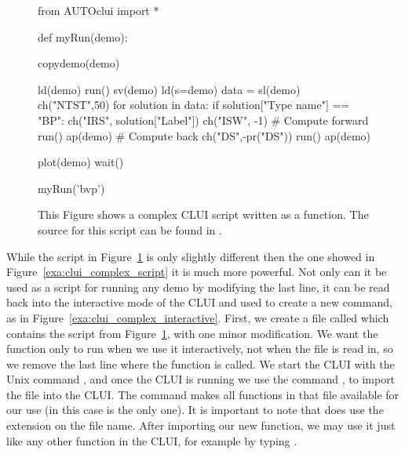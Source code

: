 \begin{figure}[htbp]
{\small \begin{center} \begin{boxedverbatim}
from AUTOclui import *

def myRun(demo):

    copydemo(demo)

    ld(demo)
    run()
    sv(demo)
    ld(s=demo)
    data = sl(demo)
    ch("NTST",50)
    for solution in data:
        if solution["Type name"] == "BP":
            ch("IRS", solution["Label"])
            ch("ISW", -1)
            # Compute forward
            run()
            ap(demo)
            # Compute back
            ch("DS",-pr("DS"))
            run()
            ap(demo)

    plot(demo)
    wait()

myRun('bvp')

\end{boxedverbatim}
\end{center} 
}
\caption[A complex \AUTOc CLUI script as a function.]
{This Figure shows a complex \AUTOc CLUI script
written as a function.
The source for this script can be found in .
}
\label{exa:clui_complex_function}
\end{figure}

While the script in Figure~\ref{exa:clui_complex_function} is 
only slightly different then the one showed in 
Figure~\ref{exa:clui_complex_script} it is much more powerful.
Not only can it be used as a script for running any demo
by modifying the last line, it can be read back into
the interactive mode of the \AUTOc CLUI and
used to create a new command, 
as in Figure~\ref{exa:clui_complex_interactive}.
First, we create a file called 
which contains the script from 
Figure~\ref{exa:clui_complex_function}, with
one minor modification.  We want the function only
to run when we use it interactively, not when
the file  is read in, so we
remove the last line where the function is called.
We start the \AUTOc CLUI with the Unix command
, and once the \AUTOc CLUI is running
we use the command ,
to import the file  into the
\AUTOc CLUI.  The  command makes
all functions in that file available for
our use (in this case  is the only 
one).  It is important to note that 
 does 
use the  extension on the file name. 
After importing our new function, we may use it
just like any other function in the \AUTOc
CLUI, for example by typing .

